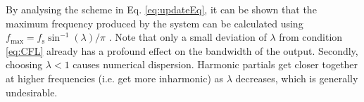 %
By analysing the scheme in Eq. \eqref{eq:updateEq}, it can be shown that the maximum frequency produced by the system can be calculated using $f_\text{max} = f_\text{s} \sin^{-1}(\lambda)/\pi$ \cite[Chap. 6]{bilbao2009}.
%
Note that only a small deviation of $\lambda$ from condition \eqref{eq:CFL} already has a profound effect on the bandwidth of the output.
%
Secondly, choosing $\lambda < 1$ causes numerical dispersion. %
Harmonic partials get closer together at higher frequencies (i.e. get more inharmonic) as $\lambda$ decreases, which is generally undesirable.


